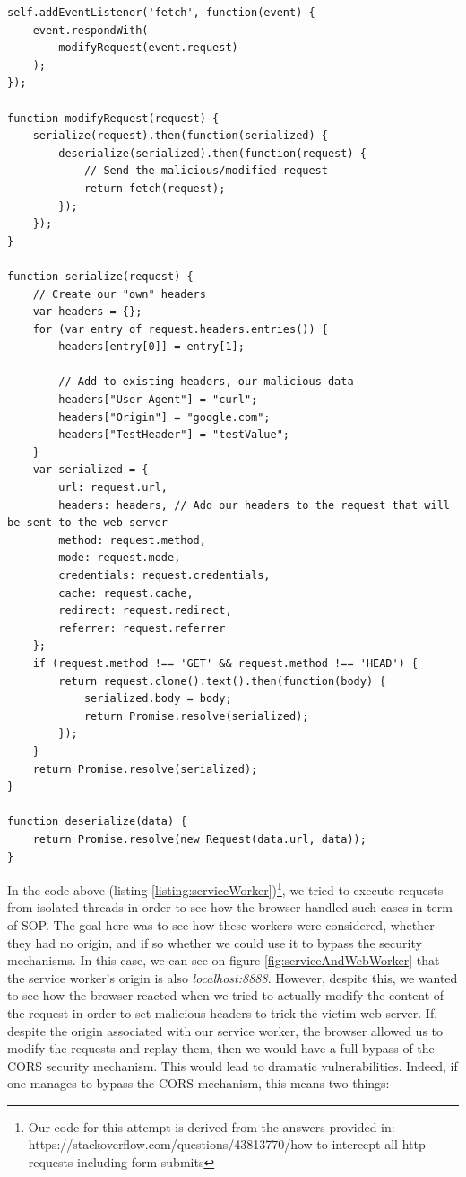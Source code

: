 \documentclass[journal]{IEEEtran}
\begin{document}
\begin{lstlisting}[caption=Trying to set malicious headers with a "malicious" service worker, label={listing:serviceWorker}]
self.addEventListener('fetch', function(event) {
    event.respondWith(
        modifyRequest(event.request)
    );
});

function modifyRequest(request) {
    serialize(request).then(function(serialized) {
        deserialize(serialized).then(function(request) {
            // Send the malicious/modified request
            return fetch(request);
        });
    });
}

function serialize(request) {
    // Create our "own" headers
    var headers = {};
    for (var entry of request.headers.entries()) {
        headers[entry[0]] = entry[1];

        // Add to existing headers, our malicious data
        headers["User-Agent"] = "curl";
        headers["Origin"] = "google.com";
        headers["TestHeader"] = "testValue";
    }
    var serialized = {
        url: request.url,
        headers: headers, // Add our headers to the request that will be sent to the web server
        method: request.method,
        mode: request.mode,
        credentials: request.credentials,
        cache: request.cache,
        redirect: request.redirect,
        referrer: request.referrer
    };
    if (request.method !== 'GET' && request.method !== 'HEAD') {
        return request.clone().text().then(function(body) {
            serialized.body = body;
            return Promise.resolve(serialized);
        });
    }
    return Promise.resolve(serialized);
}

function deserialize(data) {
    return Promise.resolve(new Request(data.url, data));
}
\end{lstlisting}

In the code above (listing \ref{listing:serviceWorker})\footnote{Our code for this attempt is derived from the answers provided in: https://stackoverflow.com/questions/43813770/how-to-intercept-all-http-requests-including-form-submits}, we tried to execute requests from isolated threads in order to see how the browser handled such cases in term of SOP. The goal here was to see how these workers were considered, whether they had no origin, and if so whether we could use it to bypass the security mechanisms. In this case, we can see on figure \ref{fig:serviceAndWebWorker} that the service worker's origin is also \emph{localhost:8888}. However, despite this, we wanted to see how the browser reacted when we tried to actually modify the content of the request in order to set malicious headers to trick the victim web server. If, despite the origin associated with our service worker, the browser allowed us to modify the requests and replay them, then we would have a full bypass of the CORS security mechanism. This would lead to dramatic vulnerabilities. Indeed, if one manages to bypass the CORS mechanism, this means two things:
\end{document}
